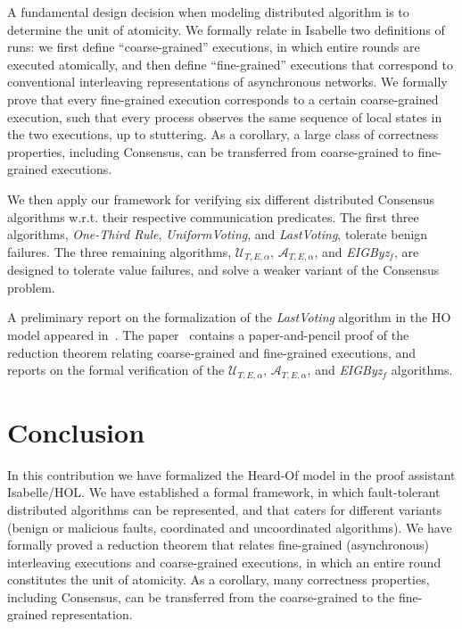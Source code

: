 \documentclass[11pt,a4paper]{article}
\newcommand{\ute}{\ensuremath{\mathcal{U}_{T,E,\alpha}}}
\newcommand{\ate}{\ensuremath{\mathcal{A}_{T,E,\alpha}}}
\newcommand{\eigbyz}{\textit{EIGByz}\ensuremath{_f}}
\begin{document}
A fundamental design decision when modeling distributed algorithm is
to determine the unit of atomicity. We formally relate in Isabelle two
definitions of runs: we first define ``coarse-grained'' executions, in
which entire rounds are executed atomically, and then define
``fine-grained'' executions that correspond to conventional
interleaving representations of asynchronous networks. We formally
prove that every fine-grained execution corresponds to a certain
coarse-grained execution, such that every process observes the same
sequence of local states in the two executions, up to stuttering. As
a corollary, a large class of correctness properties, including
Consensus, can be transferred from coarse-grained to fine-grained
executions.

We then apply our framework for verifying six different distributed
Consensus algorithms w.r.t. their respective communication predicates.
The first three algorithms, \emph{One-Third Rule}, \emph{UniformVoting},
and \emph{LastVoting}, tolerate benign failures. The three remaining
algorithms, \ute{}, \ate{}, and \eigbyz{}, are designed to tolerate
value failures, and solve a weaker variant of the Consensus problem.

A preliminary report on the formalization of the \emph{LastVoting}
algorithm in the HO model appeared in~\cite{charron:formal}.
The paper~\cite{saad:reduction} contains a paper-and-pencil proof of the
reduction theorem relating coarse-grained and fine-grained executions,
and~\cite{charron:formal-malicious} reports on the formal verification
of the \ute{}, \ate{}, and \eigbyz{} algorithms.

\bigskip




\section{Conclusion}

In this contribution we have formalized the Heard-Of model in the
proof assistant Isabelle/HOL. We have established a formal framework,
in which fault-tolerant distributed algorithms can be represented, and
that caters for different variants (benign or malicious faults,
coordinated and uncoordinated algorithms). We have formally proved a
reduction theorem that relates fine-grained (asynchronous)
interleaving executions and coarse-grained executions, in which an entire
round constitutes the unit of atomicity. As a corollary, many
correctness properties, including Consensus, can be transferred from
the coarse-grained to the fine-grained representation.
\end{document}
